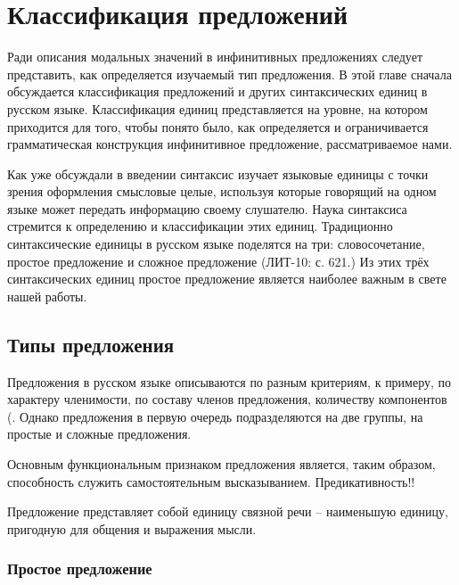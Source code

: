 \section{Классификация предложений}

Ради описания модальных значений в инфинитивных предложениях следует представить, как определяется изучаемый тип предложения. В этой главе сначала обсуждается классификация предложений и других синтаксических единиц в русском языке. Классификация единиц представляется на уровне, на котором приходится для того, чтобы понято было, как определяется и ограничивается грамматическая конструкция инфинитивное предложение, рассматриваемое нами.

Как уже обсуждали в введении синтаксис изучает языковые единицы с точки зрения оформления смысловые целые, используя которые говорящий на одном языке может передать информацию своему слушателю. Наука синтаксиса стремится к определению и классификации этих единиц. Традиционно синтаксические единицы в русском языке поделятся на три: словосочетание, простое предложение и сложное предложение (ЛИТ-10: с. 621.) Из этих трёх синтаксических единиц простое предложение является наиболее важным в свете нашей работы.



\subsection{Типы предложения}


Предложения в русском языке описываются по разным критериям, к примеру, по характеру членимости, по составу членов предложения, количеству компонентов (. Однако предложения в первую очередь подразделяются на две группы, на простые и сложные предложения. 



Основным функциональным признаком предложения является, таким образом, способность служить самостоятельным высказыванием. Предикативность!!

Предложение представляет собой единицу связной речи -- наименьшую единицу, пригодную для общения и выражения мысли.

\subsubsection{Простое предложение}




